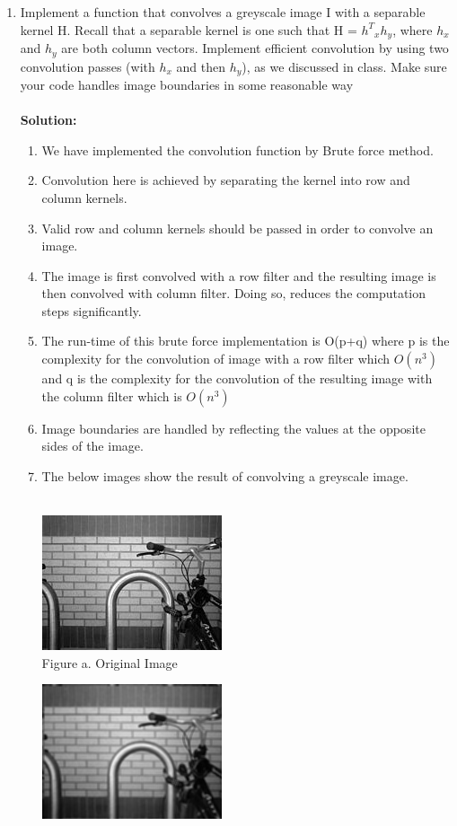 \documentclass{article}
\begin{document}
\begin{enumerate}
		\item Implement a function that convolves a greyscale image I with a separable kernel H. Recall that a separable kernel is one such that H = ${h^T}_x h_y$, where $h_x$ and $h_y$ are both column vectors. Implement efficient convolution by using two convolution passes (with $h_x$ and then $h_y$), as we discussed in class. Make sure your code handles image boundaries in some reasonable way \\ \\
		\textbf{Solution:}
		\begin{enumerate}
		\item We have implemented the convolution function by Brute force method.
		\item Convolution here is achieved by separating the kernel into row and column kernels.
		\item Valid row and column kernels should be passed in order to convolve an image.
		\item The image is first convolved with a row filter and the resulting image is then convolved with column filter. Doing so, reduces the computation steps significantly.
		\item The run-time of this brute force implementation is O(p+q) where p is the complexity for the convolution of image with a row filter which $O(n^3)$ and q is the complexity for the convolution of the resulting image with the column filter which is $O(n^3)$
		\item Image boundaries are handled by reflecting the values at the opposite sides of the image.
		\item The below images show the  result of convolving a greyscale image. \\ \\
		\begin{center}
			\includegraphics{Bikesgray.png} \\
			Figure a. Original Image
		\end{center}
		\begin{center}
			\includegraphics{detected_test.png}	\\	

\end{center}
\end{enumerate}
\end{enumerate}
\end{document}
